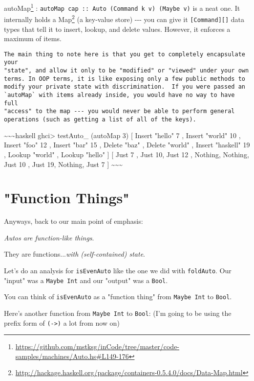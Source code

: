 \documentclass[]{article}
\renewcommand{\href}[2]{#2\footnote{\url{#1}}}
\begin{document}
\href{https://github.com/mstksg/inCode/tree/master/code-samples/machines/Auto.hs\#L149-176}{autoMap}
: \texttt{autoMap\ cap\ ::\ Auto\ (Command\ k\ v)\ (Maybe\ v)} is a neat one. It
internally holds a
\href{http://hackage.haskell.org/package/containers-0.5.4.0/docs/Data-Map.html}{Map}
(a key-value store) -\/-\/- you can give it \texttt{{[}Command{]}{[}{]}} data
types that tell it to insert, lookup, and delete values. However, it enforces a
maximum of items.

\begin{verbatim}
The main thing to note here is that you get to completely encapsulate your
"state", and allow it only to be "modified" or "viewed" under your own
terms. In OOP terms, it is like exposing only a few public methods to
modify your private state with discrimination.  If you were passed an
`autoMap` with items already inside, you would have no way to have full
"access" to the map --- you would never be able to perform general
operations (such as getting a list of all of the keys).
\end{verbatim}

\textasciitilde{}\textasciitilde{}\textasciitilde{}haskell ghci\textgreater{}
testAuto\_ (autoMap 3) \textbar{} {[} Insert "hello" 7 \textbar{} , Insert
"world" 10 \textbar{} , Insert "foo" 12 \textbar{} , Insert "bar" 15 \textbar{}
, Delete "baz" \textbar{} , Delete "world" \textbar{} , Insert "haskell" 19
\textbar{} , Lookup "world" \textbar{} , Lookup "hello" \textbar{} {]} {[} Just
7 , Just 10, Just 12 , Nothing, Nothing, Just 10 , Just 19, Nothing, Just 7 {]}
\textasciitilde{}\textasciitilde{}\textasciitilde{}

\section{"Function Things"}

Anyways, back to our main point of emphasis:

\emph{Autos are function-like things}.

They are functions...\emph{with (self-contained) state}.

Let's do an analysis for \texttt{isEvenAuto} like the one we did with
\texttt{foldAuto}. Our "input" was a \texttt{Maybe\ Int} and our "output" was a
\texttt{Bool}.

You can think of \texttt{isEvenAuto} as a "function thing" from
\texttt{Maybe\ Int} to \texttt{Bool}.

Here's another function from \texttt{Maybe\ Int} to \texttt{Bool}: (I'm going to
be using the prefix form of \texttt{(-\textgreater{})} a lot from now on)
\end{document}
